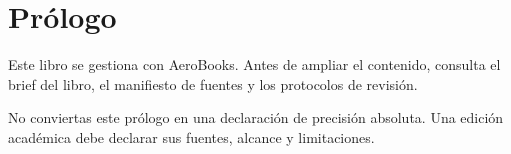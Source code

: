 \chapter*{Prólogo}

Este libro se gestiona con AeroBooks. Antes de ampliar el contenido, consulta el brief del libro, el manifiesto de fuentes y los protocolos de revisión.

\begin{warningbox}
No conviertas este prólogo en una declaración de precisión absoluta. Una edición académica debe declarar sus fuentes, alcance y limitaciones.
\end{warningbox}
